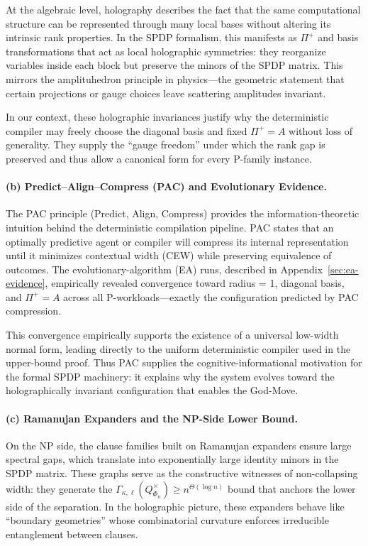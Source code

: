 \documentclass[12pt]{article}
\theoremstyle{definition}
\theoremstyle{definition}
\theoremstyle{remark}
\theoremstyle{remark}
\begin{document}
At the algebraic level, holography describes the fact that the same computational structure can be represented through many local bases without altering its intrinsic rank properties.
In the SPDP formalism, this manifests as $\Pi^+$ and basis transformations that act as local holographic symmetries: they reorganize variables inside each block but preserve the minors of the SPDP matrix.
This mirrors the amplituhedron principle in physics---the geometric statement that certain projections or gauge choices leave scattering amplitudes invariant.

In our context, these holographic invariances justify why the deterministic compiler may freely choose the diagonal basis and fixed $\Pi^+ = A$ without loss of generality.
They supply the ``gauge freedom'' under which the rank gap is preserved and thus allow a canonical form for every P-family instance.

\paragraph{(b) Predict--Align--Compress (PAC) and Evolutionary Evidence.}

The PAC principle (Predict, Align, Compress) provides the information-theoretic intuition behind the deterministic compilation pipeline.
PAC states that an optimally predictive agent or compiler will compress its internal representation until it minimizes contextual width (CEW) while preserving equivalence of outcomes.
The evolutionary-algorithm (EA) runs, described in Appendix~\ref{sec:ea-evidence}, empirically revealed convergence toward radius = 1, diagonal basis, and $\Pi^+ = A$ across all P-workloads---exactly the configuration predicted by PAC compression.

This convergence empirically supports the existence of a universal low-width normal form, leading directly to the uniform deterministic compiler used in the upper-bound proof.
Thus PAC supplies the cognitive-informational motivation for the formal SPDP machinery: it explains why the system evolves toward the holographically invariant configuration that enables the God-Move.

\paragraph{(c) Ramanujan Expanders and the NP-Side Lower Bound.}

On the NP side, the clause families built on Ramanujan expanders ensure large spectral gaps, which translate into exponentially large identity minors in the SPDP matrix.
These graphs serve as the constructive witnesses of non-collapsing width: they generate the $\Gamma_{\kappa, \ell}(Q^{\times}_{\Phi_n}) \geq n^{\Theta(\log n)}$ bound that anchors the lower side of the separation.
In the holographic picture, these expanders behave like ``boundary geometries'' whose combinatorial curvature enforces irreducible entanglement between clauses.
\end{document}
